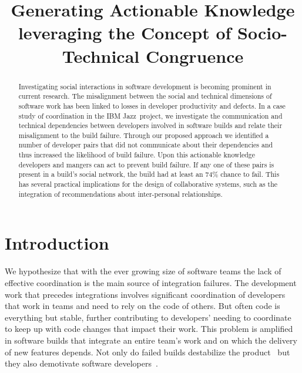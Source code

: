 \documentclass[conference]{IEEEtran}
\begin{document}
\title{Generating Actionable Knowledge leveraging the Concept of Socio-Technical Congruence}



\author{
\and
{}
}

\maketitle


\begin{abstract}
Investigating social interactions in software development is becoming 
prominent in current research. The misalignment
between the social and technical dimensions of software work has been
linked to losses in developer productivity and defects. In a case study of
coordination in the IBM Jazz\texttrademark\ project, we investigate the
communication and technical dependencies between developers involved in
software builds and relate their misalignment to the build failure.  
Through our proposed approach we identified a number of developer pairs that did not communicate about their dependencies and thus increased the likelihood of build failure. 
Upon this actionable knowledge developers and mangers can act to prevent build failure. 
If any one of these pairs is present in a build's social network, the build had at least an 74\% chance to fail. 
This has several practical implications for the design of collaborative systems, such as the integration of recommendations about inter-personal relationships.
\end{abstract}


\IEEEpeerreviewmaketitle

\section{Introduction}
We hypothesize that with the ever growing size of software teams the lack of
effective coordination is the main source of integration failures. The
development work that precedes integrations involves significant coordination of
developers that work in teams and need to rely on the code of others. 
But often code is everything but stable, further contributing to
developers' needing to coordinate to keep up with code changes that impact their work. This problem is
amplified in software builds that integrate an entire team's work
and on which the delivery of new features depends. Not only do
failed builds destabilize the product~\cite{cusumano1997} but they also demotivate
software developers~\cite{holck2004}.
\end{document}
